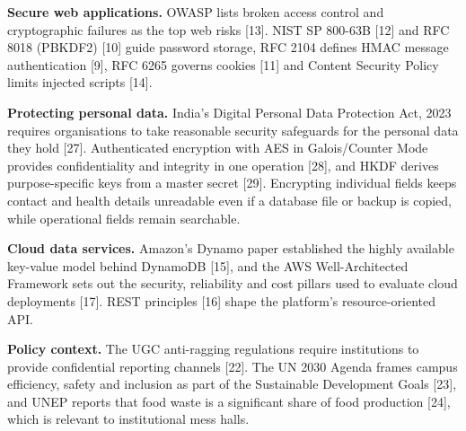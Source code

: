 \documentclass[12pt,a4paper,oneside]{report}
\begin{document}
\textbf{Secure web applications.} OWASP lists broken access control and cryptographic failures as the top web risks
[13]. NIST SP 800-63B [12] and RFC 8018 (PBKDF2) [10] guide password storage, RFC 2104 defines HMAC message
authentication [9], RFC 6265 governs cookies [11] and Content Security Policy limits injected scripts [14].

\textbf{Protecting personal data.} India's Digital Personal Data Protection Act, 2023 requires organisations to
take reasonable security safeguards for the personal data they hold [27]. Authenticated encryption with AES in
Galois/Counter Mode provides confidentiality and integrity in one operation [28], and HKDF derives purpose-specific
keys from a master secret [29]. Encrypting individual fields keeps contact and health details unreadable even if a
database file or backup is copied, while operational fields remain searchable.

\textbf{Cloud data services.} Amazon's Dynamo paper established the highly available key-value model behind DynamoDB
[15], and the AWS Well-Architected Framework sets out the security, reliability and cost pillars used to evaluate cloud
deployments [17]. REST principles [16] shape the platform's resource-oriented API.

\textbf{Policy context.} The UGC anti-ragging regulations require institutions to provide confidential reporting
channels [22]. The UN 2030 Agenda frames campus efficiency, safety and inclusion as part of the Sustainable Development
Goals [23], and UNEP reports that food waste is a significant share of food production [24], which is relevant to
institutional mess halls.
\end{document}
